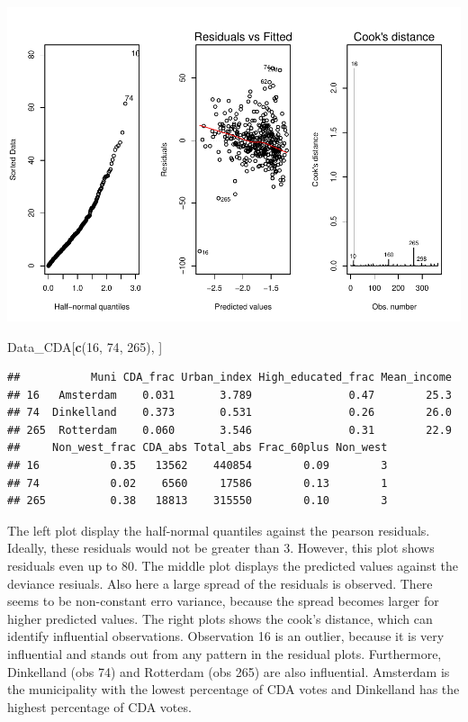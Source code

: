 \documentclass[11pt,]{article}
\newenvironment{Shaded}{\begin{snugshade}}{\end{snugshade}}
\newcommand{\KeywordTok}[1]{\textcolor[rgb]{0.13,0.29,0.53}{\textbf{#1}}}
\newcommand{\DecValTok}[1]{\textcolor[rgb]{0.00,0.00,0.81}{#1}}
\newcommand{\NormalTok}[1]{#1}
\begin{document}
\begin{center}\includegraphics{Report_files/figure-latex/unnamed-chunk-19-1} \end{center}

\begin{Shaded}
\begin{Highlighting}[]
\NormalTok{Data_CDA[}\KeywordTok{c}\NormalTok{(}\DecValTok{16}\NormalTok{, }\DecValTok{74}\NormalTok{, }\DecValTok{265}\NormalTok{), ]}
\end{Highlighting}
\end{Shaded}

\begin{verbatim}
##           Muni CDA_frac Urban_index High_educated_frac Mean_income
## 16   Amsterdam    0.031       3.789               0.47        25.3
## 74  Dinkelland    0.373       0.531               0.26        26.0
## 265  Rotterdam    0.060       3.546               0.31        22.9
##     Non_west_frac CDA_abs Total_abs Frac_60plus Non_west
## 16           0.35   13562    440854        0.09        3
## 74           0.02    6560     17586        0.13        1
## 265          0.38   18813    315550        0.10        3
\end{verbatim}

The left plot display the half-normal quantiles against the pearson
residuals. Ideally, these residuals would not be greater than 3.
However, this plot shows residuals even up to 80. The middle plot
displays the predicted values against the deviance resiuals. Also here a
large spread of the residuals is observed. There seems to be
non-constant erro variance, because the spread becomes larger for higher
predicted values. The right plots shows the cook's distance, which can
identify influential observations. Observation 16 is an outlier, because
it is very influential and stands out from any pattern in the residual
plots. Furthermore, Dinkelland (obs 74) and Rotterdam (obs 265) are also
influential. Amsterdam is the municipality with the lowest percentage of
CDA votes and Dinkelland has the highest percentage of CDA votes.
\end{document}
